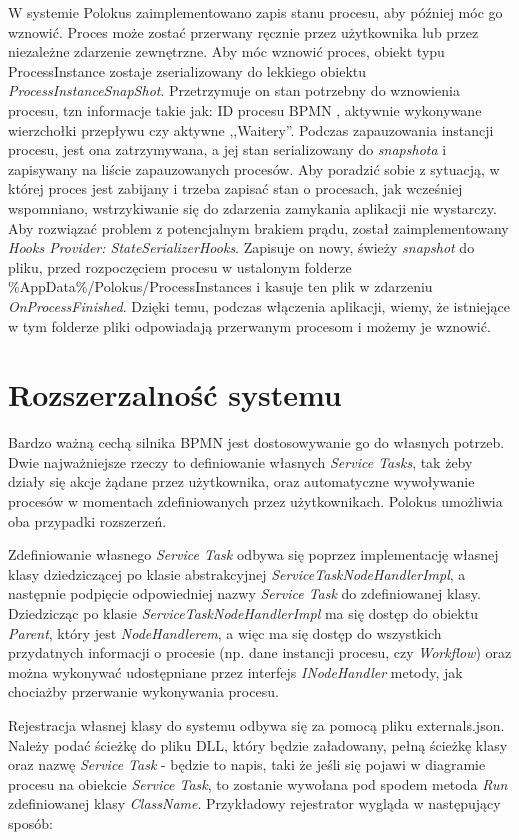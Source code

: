 \documentclass[declaration,shortabstract,mgr]{iithesis}
\newcommand{\bpmn}{BPMN }
\begin{document}
W systemie Polokus zaimplementowano zapis stanu procesu, aby później móc go wznowić. Proces może zostać przerwany ręcznie przez użytkownika lub przez niezależne zdarzenie zewnętrzne. Aby móc wznowić proces, obiekt typu ProcessInstance zostaje zserializowany do lekkiego obiektu \textit{ProcessInstanceSnapShot}. Przetrzymuje on stan potrzebny do wznowienia procesu, tzn informacje takie jak: ID procesu \bpmn, aktywnie wykonywane wierzchołki przepływu czy aktywne ,,Waitery''. Podczas zapauzowania instancji procesu, jest ona zatrzymywana, a jej stan serializowany do \textit{snapshota} i zapisywany na liście zapauzowanych procesów. Aby poradzić sobie z sytuacją, w której proces jest zabijany i trzeba zapisać stan o procesach, jak wcześniej wspomniano, wstrzykiwanie się do zdarzenia zamykania aplikacji nie wystarczy. Aby rozwiązać problem z potencjalnym brakiem prądu, został zaimplementowany \textit{Hooks Provider: StateSerializerHooks}. Zapisuje on nowy, świeży \textit{snapshot} do pliku, przed rozpoczęciem procesu w ustalonym folderze \%AppData\%/Polokus/ProcessInstances i kasuje ten plik w zdarzeniu \textit{OnProcessFinished}. Dzięki temu, podczas włączenia aplikacji, wiemy, że istniejące w tym folderze pliki odpowiadają przerwanym procesom i możemy je wznowić.

\section{Rozszerzalność systemu}
Bardzo ważną cechą silnika \bpmn jest dostosowywanie go do własnych potrzeb. Dwie najważniejsze rzeczy to definiowanie własnych \textit{Service Tasks}, tak żeby działy się akcje żądane przez użytkownika, oraz automatyczne wywoływanie procesów w momentach zdefiniowanych przez użytkownikach. Polokus umożliwia oba przypadki rozszerzeń.

Zdefiniowanie własnego \textit{Service Task} odbywa się poprzez implementację własnej klasy dziedziczącej po klasie abstrakcyjnej \textit{ServiceTaskNodeHandlerImpl}, a następnie podpięcie odpowiedniej nazwy \textit{Service Task} do zdefiniowanej klasy. Dziedzicząc po klasie \textit{ServiceTaskNodeHandlerImpl} ma się dostęp do obiektu \textit{Parent}, który jest \textit{NodeHandlerem}, a więc ma się dostęp do wszystkich przydatnych informacji o procesie (np. dane instancji procesu, czy \textit{Workflow}) oraz można wykonywać udostępniane przez interfejs \textit{INodeHandler} metody, jak chociażby przerwanie wykonywania procesu.

Rejestracja własnej klasy do systemu odbywa się za pomocą pliku externals.json. Należy podać ścieżkę do pliku DLL, który będzie załadowany, pełną ścieżkę klasy oraz nazwę \textit{Service Task} - będzie to napis, taki że jeśli się pojawi w diagramie procesu na obiekcie \textit{Service Task}, to zostanie wywołana pod spodem metoda \textit{Run} zdefiniowanej klasy \textit{ClassName}. Przykładowy rejestrator wygląda w następujący sposób:
\end{document}
